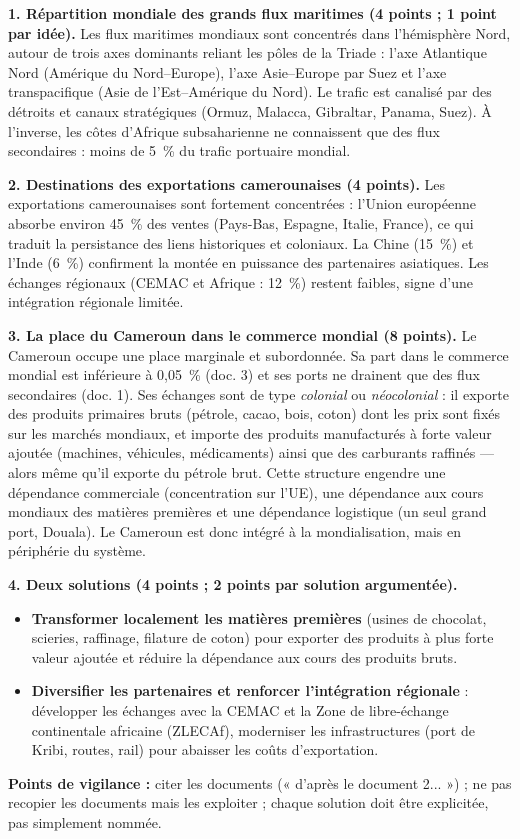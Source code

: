 \documentclass[11pt]{article}
\begin{document}
\begin{corrige}
\textbf{1. Répartition mondiale des grands flux maritimes (4 points ; 1 point par idée).} Les flux maritimes mondiaux sont concentrés dans l'hémisphère Nord, autour de trois axes dominants reliant les pôles de la Triade : l'axe Atlantique Nord (Amérique du Nord--Europe), l'axe Asie--Europe par Suez et l'axe transpacifique (Asie de l'Est--Amérique du Nord). Le trafic est canalisé par des détroits et canaux stratégiques (Ormuz, Malacca, Gibraltar, Panama, Suez). À l'inverse, les côtes d'Afrique subsaharienne ne connaissent que des flux secondaires : moins de 5~\% du trafic portuaire mondial.

\textbf{2. Destinations des exportations camerounaises (4 points).} Les exportations camerounaises sont fortement concentrées : l'Union européenne absorbe environ 45~\% des ventes (Pays-Bas, Espagne, Italie, France), ce qui traduit la persistance des liens historiques et coloniaux. La Chine (15~\%) et l'Inde (6~\%) confirment la montée en puissance des partenaires asiatiques. Les échanges régionaux (CEMAC et Afrique : 12~\%) restent faibles, signe d'une intégration régionale limitée.

\textbf{3. La place du Cameroun dans le commerce mondial (8 points).} Le Cameroun occupe une place marginale et subordonnée. Sa part dans le commerce mondial est inférieure à 0,05~\% (doc. 3) et ses ports ne drainent que des flux secondaires (doc. 1). Ses échanges sont de type \emph{colonial} ou \emph{néocolonial} : il exporte des produits primaires bruts (pétrole, cacao, bois, coton) dont les prix sont fixés sur les marchés mondiaux, et importe des produits manufacturés à forte valeur ajoutée (machines, véhicules, médicaments) ainsi que des carburants raffinés — alors même qu'il exporte du pétrole brut. Cette structure engendre une dépendance commerciale (concentration sur l'UE), une dépendance aux cours mondiaux des matières premières et une dépendance logistique (un seul grand port, Douala). Le Cameroun est donc intégré à la mondialisation, mais en périphérie du système.

\textbf{4. Deux solutions (4 points ; 2 points par solution argumentée).}
\begin{itemize}
\item \textbf{Transformer localement les matières premières} (usines de chocolat, scieries, raffinage, filature de coton) pour exporter des produits à plus forte valeur ajoutée et réduire la dépendance aux cours des produits bruts.
\item \textbf{Diversifier les partenaires et renforcer l'intégration régionale} : développer les échanges avec la CEMAC et la Zone de libre-échange continentale africaine (ZLECAf), moderniser les infrastructures (port de Kribi, routes, rail) pour abaisser les coûts d'exportation.
\end{itemize}
\textbf{Points de vigilance :} citer les documents (« d'après le document 2... ») ; ne pas recopier les documents mais les exploiter ; chaque solution doit être explicitée, pas simplement nommée.
\end{corrige}
\end{document}
